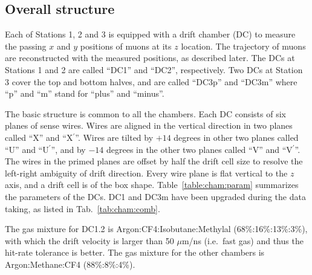 \subsection{Overall structure}

Each of Stations 1, 2 and 3 is equipped with a drift chamber (DC)
to measure the passing $x$ and $y$ positions of muons at its $z$ location.
The trajectory of muons are reconstructed with the measured positions,
as described later.
The DCs at Stations 1 and 2 are called ``DC1'' and ``DC2'', respectively.
Two DCs at Station 3 cover the top and bottom halves,
and are called ``DC3p'' and ``DC3m''
where ``p'' and ``m'' stand for ``plus'' and ``minus''.

The basic structure is common to all the chambers.
Each DC consists of six planes of sense wires.
Wires are aligned in the vertical direction
in two planes called ``X'' and ``X$^\prime$''.
Wires are tilted
by $+14$ degrees in other two planes called  ``U'' and ``U$^\prime$'', and
by $-14$ degrees in the other two planes called ``V'' and ``V$^\prime$''.
The wires in the primed planes are offset by half the drift cell size
to resolve the left-right ambiguity of drift direction.
Every wire plane is flat vertical to the $z$ axis, and a drift cell is of the box shape.
Table~\ref{table:cham:param} summarizes the parameters of the DCs.
DC1 and DC3m have been upgraded during the data taking,
as listed in Tab.~\ref{tab:cham:comb}.

The gas mixture for DC1.2 is Argon:CF4:Isobutane:Methylal
(68\%:16\%:13\%:3\%), %
with which the drift velocity is larger than 50 $\mu$m/ns (i.e.~fast gas)
and thus the hit-rate tolerance is better.
The gas mixture for the other chambers is
Argon:Methane:CF4 (88\%:8\%:4\%).

